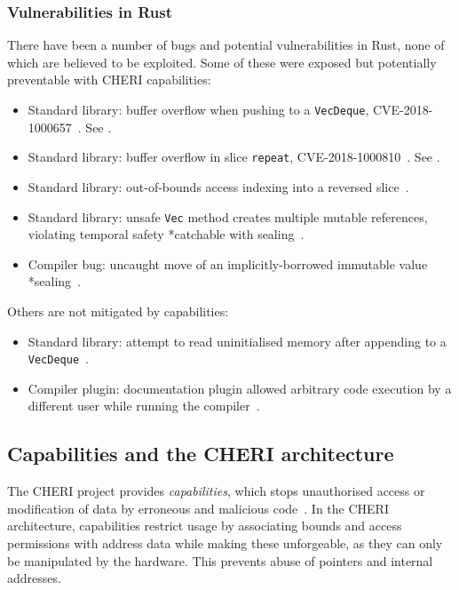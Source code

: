 \documentclass[dissertation.tex]{subfiles}
\begin{document}
\subsubsection{Vulnerabilities in Rust}
There have been a number of bugs and potential vulnerabilities in Rust,
none of which are believed to be exploited.
Some of these were exposed but potentially preventable with CHERI
capabilities:

\begin{itemize}
    \item Standard library: buffer overflow when pushing to a
    \texttt{VecDeque}, CVE-2018-1000657~\cite{cve-push,rust-issue-push}.
    See .
    \item Standard library: buffer overflow in slice \texttt{repeat},
    CVE-2018-1000810~\cite{cve-repeat,rust-advisory-repeat,rust-pr-slice}.
    See .
    \item Standard library: out-of-bounds access indexing into a
    reversed slice~\cite{rust-pr-reverse,rust-commit-reverse}.
    \item Standard library: unsafe \texttt{Vec} method creates
    multiple mutable references, violating temporal
    safety *catchable with sealing~\cite{rust-issue-vec-mut}.
    \item Compiler bug: uncaught move of an implicitly-borrowed
    immutable value *sealing~\cite{rust-issue-match-borrow}.
\end{itemize}

Others are not mitigated by capabilities:

\begin{itemize}
    \item Standard library: attempt to read uninitialised memory after
    appending to a \texttt{VecDeque}~\cite{rust-issue-deque-append}.
    \item Compiler plugin: documentation plugin allowed arbitrary code
    execution by a different user while running the
    compiler~\cite{cve-rustdoc,rust-advisory-rustdoc}.
\end{itemize}


\subsection{Capabilities and the CHERI architecture}
The CHERI project provides \emph{capabilities}, which stops unauthorised access or modification of data by erroneous and malicious code~\cite{cheri-v6}.
In the CHERI architecture, capabilities restrict usage by associating bounds and access permissions with address data while making these unforgeable, as they can only be manipulated by the hardware.
This prevents abuse of pointers and internal addresses.
\end{document}
